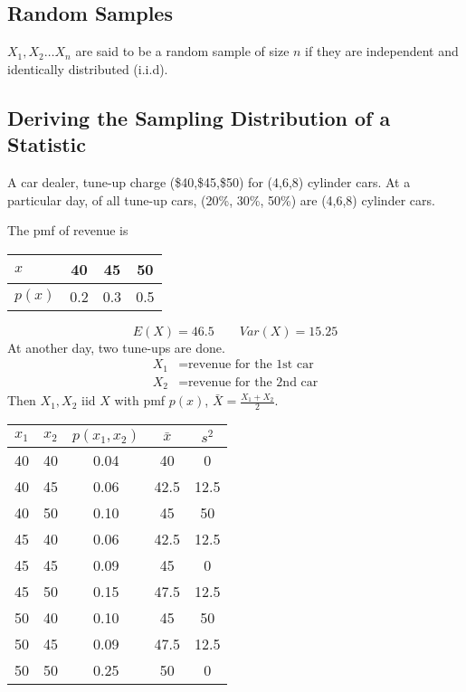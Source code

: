 \subsection{Random Samples}
\begin{defn}
$X_1,X_2 \dots X_n$ are said to be a random sample of size $n$ if they are independent and identically distributed (i.i.d).
\end{defn}

\subsection{Deriving the Sampling Distribution of a Statistic}
\begin{exmp}
A car dealer, tune-up charge (\$40,\$45,\$50) for (4,6,8) cylinder cars. At a particular day, of all tune-up cars, (20\%, 30\%, 50\%) are (4,6,8) cylinder cars.

The pmf of revenue is

\begin{center}
\begin{tabular}{l|c|c|c}
\hline
$x$ & 40 & 45 & 50\\
\hline
$p(x)$ & 0.2 & 0.3 & 0.5 \\
\hline
\end{tabular}
\end{center}
\[E(X)=46.5 \qquad Var(X)=15.25\]
At another day, two tune-ups are done.
\begin{align*}
X_1&=\text{revenue for the 1st car}\\
X_2&=\text{revenue for the 2nd car}
\end{align*}
Then $X_1, X_2$ iid $X$ with pmf $p(x)$, $\bar{X}=\frac{X_1+X_2}{2}$.
\begin{center}
\begin{tabular}{l|l|c|c|c}
\hline
$x_1$ &$x_2$ & $p(x_1,x_2)$ & $\bar{x}$ & $s^2$\\
\hline
40 & 40 & 0.04 & 40 & 0 \\
\hline
40 & 45 & 0.06 & 42.5 & 12.5 \\
\hline
40 & 50 & 0.10 & 45 & 50 \\
\hline
45 & 40 & 0.06 & 42.5 & 12.5 \\
\hline
45 & 45 & 0.09 & 45 & 0 \\
\hline
45 & 50 & 0.15 & 47.5 & 12.5 \\
\hline
50 & 40 & 0.10 & 45 & 50 \\
\hline
50 & 45 & 0.09 & 47.5 & 12.5 \\
\hline
50 & 50 & 0.25 & 50 & 0 \\
\hline
\end{tabular}
\end{center}


\end{exmp}

